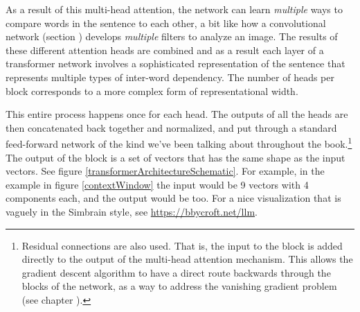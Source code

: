 As a result of this multi-head attention, the network can learn \emph{multiple} ways to compare words in the sentence to each other, a bit like how a convolutional network (section ) develops \emph{multiple} filters to analyze an image. The results of these different attention heads are combined and as a result each layer of a transformer network involves a sophisticated representation of the sentence that represents multiple types of inter-word dependency. The number of heads per block corresponds to a more complex form of representational width.

This entire process happens once for each head. The outputs of all the heads are then concatenated back together and normalized, and put through a standard feed-forward network of the kind we've been talking about throughout the book.\footnote{Residual connections are also used. That is, the input to the block is added directly to the output of the multi-head attention mechanism. This allows the gradient descent algorithm to have a direct route backwards through the blocks of the network, as a way to address the vanishing gradient problem (see chapter ). }  The output of the block is a set of vectors that has the same shape as the input vectors. See figure \ref{transformerArchitectureSchematic}. For example, in the example in figure \ref{contextWindow} the input would be 9 vectors with 4 components each, and the output would be too. For a nice visualization that is vaguely in the Simbrain style, see \url{https://bbycroft.net/llm}.

